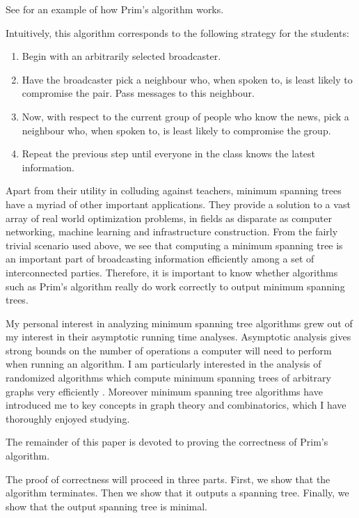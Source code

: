 \documentclass[a4paper,11pt]{report}
\theoremstyle{plain}
\theoremstyle{definition}
\begin{document}
See  for an example of how Prim's algorithm works.

Intuitively, this algorithm corresponds to the following strategy for the
students:

\begin{enumerate}
    \item Begin with an arbitrarily selected broadcaster.
    \item Have the broadcaster pick a neighbour who, when spoken to, is least
    likely to compromise the pair. Pass messages to this neighbour.
    \item Now, with respect to the current group of people who know the news,
    pick a neighbour who, when spoken to, is least likely to compromise the
    group.
    \item Repeat the previous step until everyone in the class knows the latest
    information.
\end{enumerate}



Apart from their utility in colluding against teachers, minimum spanning trees
have a myriad of other important applications. They provide a solution to a
vast array of real world optimization problems, in fields as disparate as
computer networking, machine learning and infrastructure construction. From the
fairly trivial scenario used above, we see that computing a minimum spanning
tree is an important part of broadcasting information efficiently among a set
of interconnected parties. Therefore, it is important to know whether
algorithms such as Prim's algorithm really do work correctly to output minimum
spanning trees.

My personal interest in analyzing minimum spanning tree algorithms grew out of
my interest in their asymptotic running time analyses. Asymptotic analysis
gives strong bounds on the number of operations a computer will need to perform
when running an algorithm. I am particularly interested in the analysis of
randomized algorithms which compute minimum spanning trees of arbitrary graphs
very efficiently \cite{linear-rand-mst}. Moreover minimum spanning tree
algorithms have introduced me to key concepts in graph theory and combinatorics,
which I have thoroughly enjoyed studying.

The remainder of this paper is devoted to proving the correctness of Prim's
algorithm.

The proof of correctness will proceed in three parts. First, we show that the
algorithm terminates. Then we show that it outputs a spanning tree. Finally,
we show that the output spanning tree is minimal.
\end{document}
